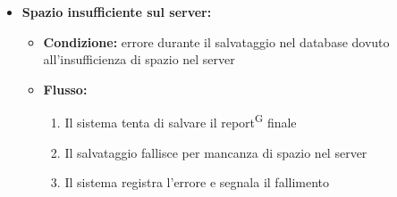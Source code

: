 \documentclass[a4paper, 11pt]{article}
\begin{document}
\begin{itemize}
\begin{itemize}
\begin{itemize}
				\item \textbf{Flusso:}
				\begin{enumerate}
					\item L'orchestratore valida i report\textsuperscript{G} ricevuti
					\item Un report\textsuperscript{G} risulta non valido
					\item Il sistema registra l'errore
				\end{enumerate}
			\end{itemize}
		\item \textbf{Spazio insufficiente sul server:}
			\begin{itemize}
				\item \textbf{Condizione:} errore durante il salvataggio nel database dovuto all'insufficienza di spazio nel server
				\item \textbf{Flusso:}
				\begin{enumerate}
					\item Il sistema tenta di salvare il report\textsuperscript{G} finale
					\item Il salvataggio fallisce per mancanza di spazio nel server
					\item Il sistema registra l'errore e segnala il fallimento
				\end{enumerate}
			\end{itemize}
	\end{itemize}
\end{itemize}
\end{document}
